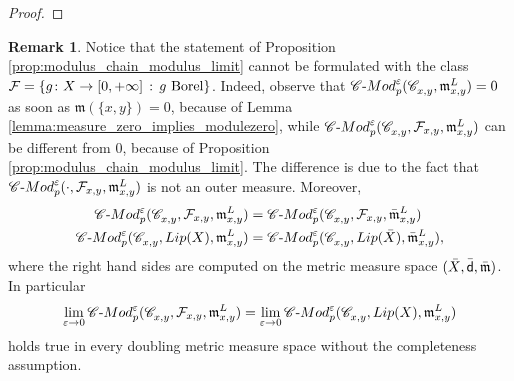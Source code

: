 \documentclass[12pt]{amsart}
\newcommand{\R}{\mathbb{R}}
\newcommand{\sfd}{{\sf d}}
\renewcommand{\d}{{\mathrm d}}
\newcommand{\X}{{\rm X}}
\newcommand{\Lip}{{\rm Lip}}
\newcommand{\mm}{\mathfrak m}
\newtheorem{proposition}[theorem]{Proposition}
\theoremstyle{definition}
\newtheorem{remark}[theorem]{Remark}
\newcommand{\cModepsilon}[2]{{\mathscr C}\text{-}{\rm Mod}_{#2}^{#1}}
\newcommand{\Chain}[1]{\mathscr{C}^{#1}}
\newcommand{\LUG}[1]{{\rm LUG}^{#1}}
\begin{document}
\begin{proof}
\end{proof}
%
\begin{remark}
\label{rmk:chain_modulus_PI}
    Notice that the statement of Proposition \ref{prop:modulus_chain_modulus_limit} cannot be formulated with the class $\mathcal{F} = \{ g\colon \X \to [0,+\infty]\,:\, g \text{ Borel}\}$.
    Indeed, observe that $\cModepsilon{\varepsilon}{p}(\Chain{}_{x,y},\mm_{x,y}^L) = 0$ as soon as $\mm(\{x,y\}) = 0$, because of Lemma \ref{lemma:measure_zero_implies_modulezero}, while $\cModepsilon{\varepsilon}{p}(\Chain{}_{x,y}, \mathcal{F}_{x,y} ,\mm_{x,y}^L)$ can be different from $0$, because of Proposition \ref{prop:modulus_chain_modulus_limit}. The difference is due to the fact that $\cModepsilon{\varepsilon}{p}(\cdot, \mathcal{F}_{x,y} ,\mm_{x,y}^L)$ is not an outer measure. 
    Moreover, 
    \begin{equation}
        \begin{aligned}
            \cModepsilon{\varepsilon}{p}(\Chain{}_{x,y}, \mathcal{F}_{x,y} ,\mm_{x,y}^L) &= \cModepsilon{\varepsilon}{p}(\Chain{}_{x,y}, \mathcal{F}_{x,y} ,\bar{\mm}_{x,y}^L)\\
            \cModepsilon{\varepsilon}{p}(\Chain{}_{x,y}, \Lip(\X) ,\mm_{x,y}^L) &= \cModepsilon{\varepsilon}{p}(\Chain{}_{x,y}, \Lip(\bar{\X}) ,\bar{\mm}_{x,y}^L),
        \end{aligned}
    \end{equation}
    where the right hand sides are computed on the metric measure space $(\bar{\X}, \bar{\sfd}, \bar{\mm})$. In particular 
    $$\lim_{\varepsilon \to 0} \cModepsilon{\varepsilon}{p}(\Chain{}_{x,y}, \mathcal{F}_{x,y} ,\mm_{x,y}^L) = \lim_{\varepsilon \to 0} \cModepsilon{\varepsilon}{p}(\Chain{}_{x,y}, \Lip(\X), \mm_{x,y}^L)$$
    holds true in every doubling metric measure space without the completeness assumption.
\end{remark}
%
\end{document}
